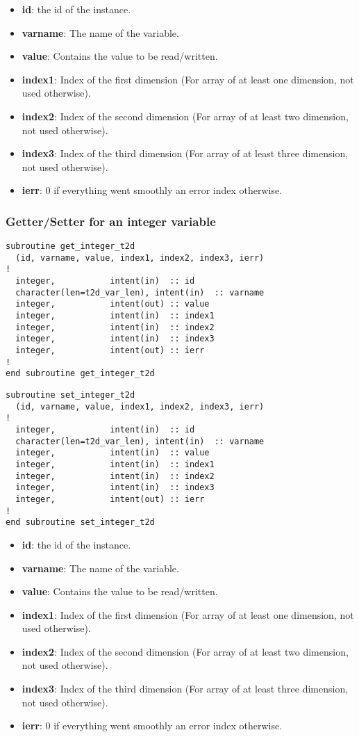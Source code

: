 \begin{itemize}
\item \textbf{id}: the id of the instance.
\item \textbf{varname}: The name of the variable.
\item \textbf{value}: Contains the value to be read/written.
\item \textbf{index1}: Index of the first dimension (For array of at least one
dimension, not used otherwise).
\item \textbf{index2}: Index of the second dimension (For array of at least two
dimension, not used otherwise).
\item \textbf{index3}: Index of the third dimension (For array of at least
three dimension, not used otherwise).
\item \textbf{ierr}: 0 if everything went smoothly an error index otherwise.
\end{itemize}
%
\subsubsection{Getter/Setter for an integer variable}
%
\begin{lstlisting}
subroutine get_integer_t2d
  (id, varname, value, index1, index2, index3, ierr)
!
  integer,           intent(in)  :: id
  character(len=t2d_var_len), intent(in)  :: varname
  integer,           intent(out) :: value
  integer,           intent(in)  :: index1
  integer,           intent(in)  :: index2
  integer,           intent(in)  :: index3
  integer,           intent(out) :: ierr
!        
end subroutine get_integer_t2d
\end{lstlisting}

\begin{lstlisting}
subroutine set_integer_t2d
  (id, varname, value, index1, index2, index3, ierr)
!
  integer,           intent(in)  :: id
  character(len=t2d_var_len), intent(in)  :: varname
  integer,           intent(in)  :: value
  integer,           intent(in)  :: index1
  integer,           intent(in)  :: index2
  integer,           intent(in)  :: index3
  integer,           intent(out) :: ierr
!        
end subroutine set_integer_t2d
\end{lstlisting}

\begin{itemize}
\item \textbf{id}: the id of the instance.
\item \textbf{varname}: The name of the variable.
\item \textbf{value}: Contains the value to be read/written.
\item \textbf{index1}: Index of the first dimension (For array of at least one
dimension, not used otherwise).
\item \textbf{index2}: Index of the second dimension (For array of at least two
dimension, not used otherwise).
\item \textbf{index3}: Index of the third dimension (For array of at least
three dimension, not used otherwise).
\item \textbf{ierr}: 0 if everything went smoothly an error index otherwise.
\end{itemize}
%
